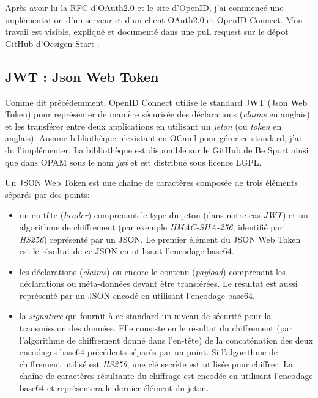 Après avoir lu la RFC d'OAuth2.0 et le site d'OpenID, j'ai commencé une implémentation d'un serveur
et d'un client OAuth2.0 et OpenID Connect. Mon travail est visible, expliqué et documenté
dans une pull request sur le dépot GitHub d'Ocsigen Start \cite{ocsigen-start-github}.


\subsection{JWT : Json Web Token}

Comme dit précédemment, OpenID Connect utilise le standard JWT (Json Web
Token)\cite{official-jwt-website, official-openid-connect-website, rfc-jwt}
pour représenter de manière sécurisée des déclarations (\emph{claims} en anglais) et les
transférer entre deux applications en utilisant un \textit{jeton} (ou
\textit{token} en anglais).
Aucune bibliothèque n'existant en OCaml pour gérer ce standard, j'ai du
l'implémenter. La bibliothèque est disponible sur le GitHub de Be
Sport\cite{ocaml-jwt-github} ainsi que
dans OPAM sous le nom \emph{jwt} et est distribué sous licence LGPL.

Un JSON Web Token est une chaine de caractères composée de trois éléments séparés
par des points:
\begin{itemize}
  \item un en-tête (\textit{header}) comprenant le type du jeton (dans notre cas
    \emph{JWT}) et un algorithme de chiffrement (par exemple
    \emph{HMAC-SHA-256}, identifié par \emph{HS256})
    représenté par un JSON. Le premier élément du JSON Web Token est le
    résultat de ce JSON en utilisant l'encodage base64\cite{rfc-base64}.
  \item les déclarations (\textit{claims}) ou encore le contenu
    (\textit{payload}) comprenant les déclarations ou méta-données devant être
transférées. Le résultat est aussi représenté par un JSON encodé en utilisant
l'encodage base64.
  \item la \textit{signature} qui fournit à ce standard un niveau de sécurité
    pour la transmission des données. Elle consiste en le résultat du chiffrement
    (par l'algorithme de chiffrement donné dans l'en-tête) de la concaténation des
    deux encodages base64 précédents séparés par un point. Si l'algorithme de
    chiffrement utilisé est \emph{HS256}, une clé secrète est utilisée pour
    chiffrer. La chaîne de caractères résultante du chiffrage est encodée en
    utilisant l'encodage base64 et représentera le dernier élément du jeton.
\end{itemize}

